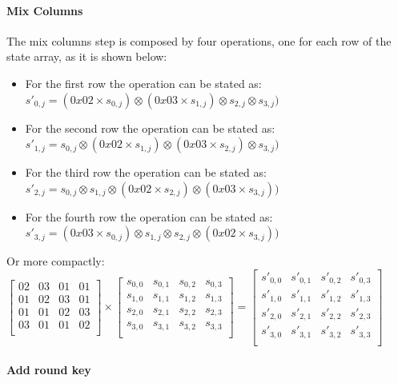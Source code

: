 \paragraph{Mix Columns}
The mix columns step is composed by four operations, one for each row of the state array, as it is shown below:

\begin{itemize}
	\item For the first row the operation can be stated as: 
	$s'_{0,j} = (0x02 \times s_{0,j}) \otimes (0x03 \times s_{1,j}) \otimes s_{2,j} \otimes s_{3,j})$
	\item For the second row the operation can be stated as: 
	$s'_{1,j} = s_{0,j} \otimes (0x02 \times s_{1,j}) \otimes (0x03 \times s_{2,j}) \otimes s_{3,j})$
	\item For the third row the operation can be stated as: 
	$s'_{2,j} = s_{0,j} \otimes s_{1,j} \otimes (0x02 \times s_{2,j}) \otimes (0x03 \times s_{3,j}))$
	\item For the fourth row the operation can be stated as: 
	$s'_{3,j} = (0x03 \times s_{0,j}) \otimes s_{1,j} \otimes s_{2,j} \otimes (0x02 \times s_{3,j}))$
\end{itemize}

Or more compactly:
$
\begin{bmatrix}
02 & 03 & 01 & 01 \\ 
01 & 02 & 03 & 01 \\
01 & 01 & 02 & 03 \\
03 & 01 & 01 & 02 \\
\end{bmatrix}
\times
\begin{bmatrix}
s_{0,0} & s_{0,1} & s_{0,2} & s_{0,3} \\ 
s_{1,0} & s_{1,1} & s_{1,2} & s_{1,3} \\
s_{2,0} & s_{2,1} & s_{2,2} & s_{2,3} \\
s_{3,0} & s_{3,1} & s_{3,2} & s_{3,3} \\
\end{bmatrix}
=
\begin{bmatrix}
s'_{0,0} & s'_{0,1} & s'_{0,2} & s'_{0,3} \\ 
s'_{1,0} & s'_{1,1} & s'_{1,2} & s'_{1,3} \\
s'_{2,0} & s'_{2,1} & s'_{2,2} & s'_{2,3} \\
s'_{3,0} & s'_{3,1} & s'_{3,2} & s'_{3,3} \\
\end{bmatrix}
$

\paragraph{Add round key}

